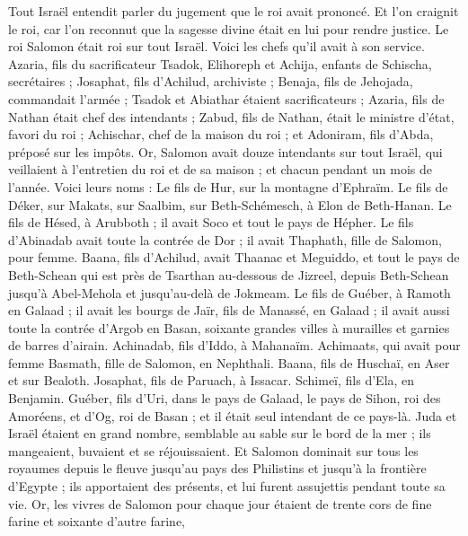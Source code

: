 \begin{multicols}{2}
Tout Israël entendit parler du jugement que le roi avait prononcé. Et l’on craignit le roi, car l’on reconnut que la sagesse divine était en lui pour rendre justice.
\VerseOne{}Le roi Salomon était roi sur tout Israël.
Voici les chefs qu’il avait à son service. Azaria, fils du sacrificateur Tsadok,
Elihoreph et Achija, enfants de Schischa, secrétaires ; Josaphat, fils d'Achilud, archiviste ;
Benaja, fils de Jehojada, commandait l'armée ; Tsadok et Abiathar étaient sacrificateurs ;
Azaria, fils de Nathan était chef des intendants ; Zabud, fils de Nathan, était le ministre d’état, favori du roi ;
Achischar, chef de la maison du roi ; et Adoniram, fils d’Abda, préposé sur les impôts.
Or, Salomon avait douze intendants sur tout Israël, qui veillaient à l’entretien du roi et de sa maison ; et chacun pendant un mois de l'année.
Voici leurs noms : Le fils de Hur, sur la montagne d'Ephraïm.
Le fils de Déker, sur Makats, sur Saalbim, sur Beth-Schémesch, à Elon de Beth-Hanan.
Le fils de Hésed, à Arubboth ; il avait Soco et tout le pays de Hépher.
Le fils d'Abinadab avait toute la contrée de Dor ; il avait Thaphath, fille de Salomon, pour femme.
Baana, fils d'Achilud, avait Thaanac et Meguiddo, et tout le pays de Beth-Schean qui est près de Tsarthan au-dessous de Jizreel, depuis Beth-Schean jusqu'à Abel-Mehola et jusqu'au-delà de Jokmeam.
Le fils de Guéber, à Ramoth en Galaad ; il avait les bourgs de Jaïr, fils de Manassé, en Galaad ; il avait aussi toute la contrée d'Argob en Basan, soixante grandes villes à murailles et garnies de barres d'airain.
Achinadab, fils d’Iddo, à Mahanaïm.
Achimaats, qui avait pour femme Basmath, fille de Salomon, en Nephthali.
Baana, fils de Huschaï, en Aser et sur Bealoth.
Josaphat, fils de Paruach, à Issacar.
Schimeï, fils d'Ela, en Benjamin.
Guéber, fils d'Uri, dans le pays de Galaad, le pays de Sihon, roi des Amoréens, et d’Og, roi de Basan ; et il était seul intendant de ce pays-là.
Juda et Israël étaient en grand nombre, semblable au sable sur le bord de la mer ; ils mangeaient, buvaient et se réjouissaient.
Et Salomon dominait sur tous les royaumes depuis le fleuve jusqu'au pays des Philistins et jusqu'à la frontière d'Egypte ; ils apportaient des présents, et lui furent assujettis pendant toute sa vie.
Or, les vivres de Salomon pour chaque jour étaient de trente cors de fine farine et soixante d'autre farine,

\end{multicols}
